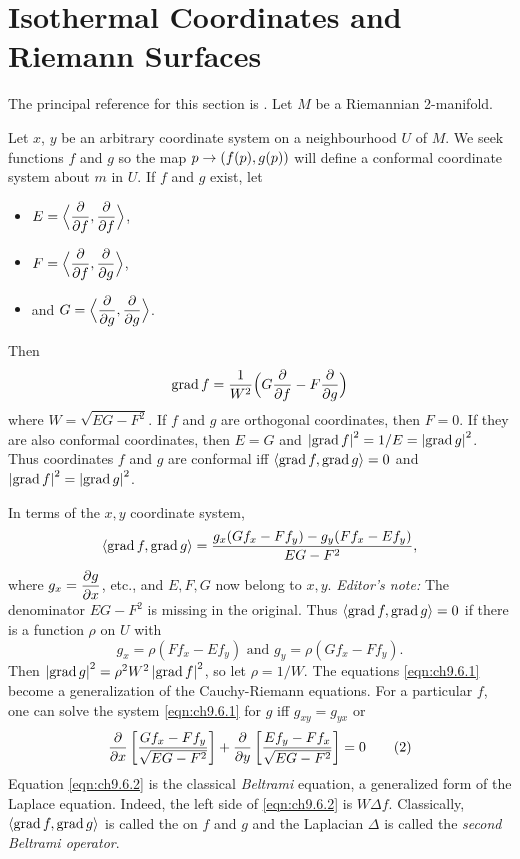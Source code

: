 \documentclass[../main]{subfiles}
\begin{document}
\section{Isothermal Coordinates and Riemann Surfaces}\label{ch09:s6}

The principal reference for this section is  \cite{samelson1955differential}. Let $M$ be a Riemannian 2-manifold. 

Let $x$, $y$ be an arbitrary coordinate system on a neighbourhood $U$ of $M$. We seek functions $f$ and $g$ so the map $p \to (f(p), g(p))$ will define a conformal coordinate system about $m$ in $U$. If $f$ and $g$ exist, let 
\begin{itemize}
    \item $E = \Big\langle \dfrac{\partial }{\partial f},\dfrac{\partial }{\partial f}\Big\rangle$, 
    \item $F = \Big\langle \dfrac{\partial }{\partial f}, \dfrac{\partial }{\partial g}\Big\rangle$,
    \item and $G = \Big\langle \dfrac{\partial }{\partial g},\dfrac{\partial }{\partial g}\Big\rangle$. 
\end{itemize}
 Then \[\operatorname{grad} f = \dfrac{1}{W^2}\Big(G\dfrac{\partial }{\partial f} - F\dfrac{\partial }{\partial g}\Big)\]
 where $W = \sqrt{EG - F^2}$. If $f$ and $g$ are orthogonal coordinates, then $F=0$. If they are also conformal coordinates, then $E=G$ and $\left|\operatorname{grad} f\right|^2 = 1/E = \left|\operatorname{grad} g\right|^2$. Thus coordinates $f$ and $g$ are conformal iff $\left\langle\operatorname{grad}{f},\operatorname{grad}{g}\right\rangle = 0$ and $\left|\operatorname{grad} f\right|^2 = \left|\operatorname{grad} g\right|^2$.

In terms of the $x,y$ coordinate system,
\[\left\langle\operatorname{grad} f,\operatorname{grad} g\right\rangle=\frac{g_x(Gf_x-Ff_y)-g_y(Ff_x-Ef_y)}{EG-F^2},\]
where $g_x=\dfrac{\partial g}{\partial x}$, etc., and $E,F,G$ now belong to $x,y$. \emph{Editor's note:} The denominator $EG-F^2$ is missing in the original. Thus $\left\langle\operatorname{grad} f,\operatorname{grad} g\right\rangle=0$ if there is a function $\rho$ on $U$ with
\begin{equation}
    g_x = \rho(Ff_x-Ef_y) \text{ and } g_y = \rho(Gf_x - Ff_y).\tag{1}\label{eqn:ch9.6.1}
\end{equation}
Then $\left|\operatorname{grad}{g}\right|^2 = \rho^2 W^2\left|\operatorname{grad} f\right|^2$, so let $\rho = 1/W$. The equations \eqref{eqn:ch9.6.1} become a generalization of the Cauchy-Riemann equations. For a particular $f$, one can solve the system \eqref{eqn:ch9.6.1} for $g$ iff $g_{xy} = g_{yx}$ or
\begin{equation}
    \dfrac{\partial }{\partial x}\left[\frac{Gf_x - Ff_y}{\sqrt{EG - F^2}}\right] + \dfrac{\partial }{\partial y}\left[\frac{Ef_y - Ff_x}{\sqrt{EG-F^2}}\right] = 0\tag{2}\label{eqn:ch9.6.2}
\end{equation}
Equation \eqref{eqn:ch9.6.2} is the classical \emph{Beltrami} equation, a generalized form of the Laplace equation. Indeed, the left side of \eqref{eqn:ch9.6.2} is $W\Delta f$. Classically, $\left\langle\operatorname{grad} f,\operatorname{grad} g\right\rangle$ is called the  on $f$ and $g$ and the Laplacian $\Delta$ is called the \emph{second Beltrami operator}. 
\end{document}
